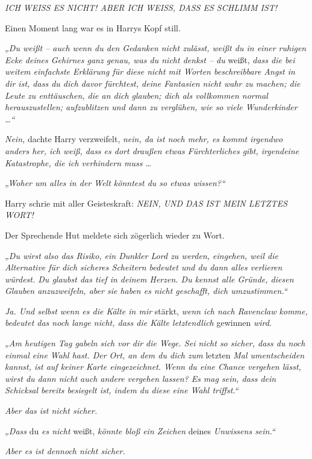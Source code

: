 \emph{ICH WEISS ES NICHT! ABER ICH WEISS, DASS ES SCHLIMM IST!} 

Einen Moment lang war es in Harrys Kopf still. 

\emph{„Du weißt – auch wenn du den Gedanken nicht zulässt, weißt du in einer ruhigen Ecke deines Gehirnes ganz genau, was du nicht denkst – du }weißt,\emph{ dass die bei weitem einfachste Erklärung für diese nicht mit Worten beschreibbare Angst in dir ist, dass du dich davor fürchtest, deine Fantasien nicht wahr zu machen; die Leute zu enttäuschen, die an dich glauben; dich als vollkommen normal herauszustellen; aufzublitzen und dann zu verglühen, wie so viele Wunderkinder …“ }

\emph{Nein,} dachte Harry verzweifelt, \emph{nein, da ist noch mehr, es kommt irgendwo anders her, ich weiß, dass es dort draußen etwas Fürchterliches gibt, irgendeine Katastrophe, die ich verhindern muss … }

\emph{„Woher um alles in der Welt könntest du so etwas wissen?“} 

Harry schrie mit aller Geisteskraft: \emph{NEIN, UND DAS IST MEIN LETZTES WORT!} 

Der Sprechende Hut meldete sich zögerlich wieder zu Wort. 

\emph{„Du wirst also das Risiko, ein Dunkler Lord zu werden, eingehen, weil die Alternative für dich sicheres Scheitern bedeutet und du dann alles verlieren würdest. Du glaubst das tief in deinem Herzen. Du kennst alle Gründe, diesen Glauben anzuzweifeln, aber sie haben es nicht geschafft, dich umzustimmen.“ }

\emph{Ja. Und selbst wenn es die Kälte in mir }stärkt,\emph{ wenn ich nach Ravenclaw komme, bedeutet das noch lange nicht, dass die Kälte letztendlich }gewinnen\emph{ wird. }

\emph{„Am heutigen Tag gabeln sich vor dir die Wege. Sei nicht so sicher, dass du noch einmal eine Wahl hast. Der Ort, an dem du dich zum }letzten\emph{ Mal umentscheiden kannst, ist auf keiner Karte eingezeichnet. Wenn du eine Chance vergehen lässt, wirst du dann nicht auch andere vergehen lassen? Es mag sein, dass dein Schicksal bereits besiegelt ist, indem du diese eine Wahl triffst.“ }

\emph{Aber das ist nicht sicher. }

\emph{„Dass }du\emph{ es nicht }weißt,\emph{ könnte bloß ein Zeichen }deines\emph{ Unwissens sein.“ }

\emph{Aber es ist dennoch nicht sicher.} 

